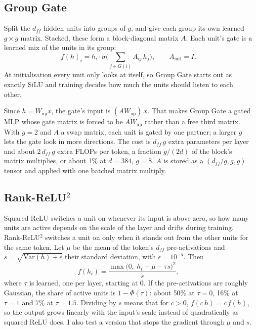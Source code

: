\documentclass{article}
\begin{document}
\subsection{Group Gate}

Split the $d_{ff}$ hidden units into groups of $g$, and give each group its own learned $g \times g$ matrix.
Stacked, these form a block-diagonal matrix $A$.
Each unit's gate is a learned mix of the units in its group:
\begin{equation}
  \label{eq:groupgate}
  f(h)_i = h_i \cdot \sigma\Big(\sum_{j \in G(i)} A_{ij}\, h_j\Big), \qquad A_{\text{init}} = I.
\end{equation}
At initialisation every unit only looks at itself, so Group Gate starts out as exactly SiLU and training decides how much the units should listen to each other.

Since $h = W_{\text{up}} x$, the gate's input is $(A W_{\text{up}})\, x$.
That makes Group Gate a gated MLP whose gate matrix is forced to be $A W_{\text{up}}$ rather than a free third matrix.
With $g = 2$ and $A$ a swap matrix, each unit is gated by one partner; a larger $g$ lets the gate look in more directions.
The cost is $d_{ff}\, g$ extra parameters per layer and about $2\, d_{ff}\, g$ extra FLOPs per token, a fraction $g/(2d)$ of the block's matrix multiplies, or about 1\% at $d = 384$, $g = 8$.
$A$ is stored as a $(d_{ff}/g, g, g)$ tensor and applied with one batched matrix multiply.

\subsection{\texorpdfstring{Rank-ReLU$^2$}{Rank-ReLU2}}

Squared ReLU switches a unit on whenever its input is above zero, so how many units are active depends on the scale of the layer and drifts during training.
Rank-ReLU$^2$ switches a unit on only when it stands out from the other units for the same token.
Let $\mu$ be the mean of the token's $d_{ff}$ pre-activations and $s = \sqrt{\mathrm{Var}(h) + \epsilon}$ their standard deviation, with $\epsilon = 10^{-5}$.
Then
\begin{equation}
  \label{eq:rank}
  f(h_i) = \frac{\max\big(0,\; h_i - \mu - \tau s\big)^2}{s},
\end{equation}
where $\tau$ is learned, one per layer, starting at 0.
If the pre-activations are roughly Gaussian, the share of active units is $1 - \Phi(\tau)$: about 50\% at $\tau = 0$, 16\% at $\tau = 1$ and 7\% at $\tau = 1.5$.
Dividing by $s$ means that for $c > 0$, $f(c\,h) = c\, f(h)$, so the output grows linearly with the input's scale instead of quadratically as squared ReLU does.
I also test a version that stops the gradient through $\mu$ and $s$.
\end{document}
